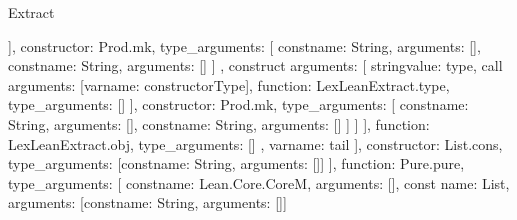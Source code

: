 \begin{lexlean}{Extract}
\begin{toolingmodule}
{{{{{{{{{{{{{{{{{                                                      ],
                                                      constructor: Prod.mk,
                                                      type_arguments: [
                                                        const{name: String, arguments: []},
                                                        const{name: String, arguments: []}
                                                      ]
                                                    },
                                                    construct{
                                                      arguments: [
                                                        string{value: type},
                                                        call{
                                                          arguments: [var{name: constructorType}],
                                                          function: LexLeanExtract.type,
                                                          type_arguments: []
                                                        }
                                                      ],
                                                      constructor: Prod.mk,
                                                      type_arguments: [
                                                        const{name: String, arguments: []},
                                                        const{name: String, arguments: []}
                                                      ]
                                                    }
                                                  ]
                                                }
                                              ],
                                              function: LexLeanExtract.obj,
                                              type_arguments: []
                                            },
                                            var{name: tail}
                                          ],
                                          constructor: List.cons,
                                          type_arguments: [const{name: String, arguments: []}]
                                        }
                                      ],
                                      function: Pure.pure,
                                      type_arguments: [
                                        const{name: Lean.Core.CoreM, arguments: []},
                                        const{
                                          name: List,
                                          arguments: [const{name: String, arguments: []}]
}}}}}}}}}}}}}}
\end{toolingmodule}
\end{lexlean}

